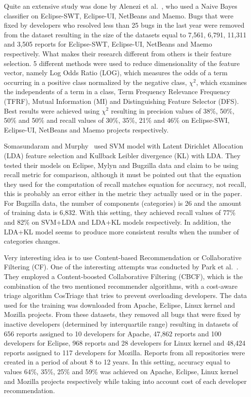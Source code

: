 Quite an extensive study was done by Alenezi et al.~\cite{Alenezi2013}, who used a Naive Bayes classifier on Eclipse-SWT, Eclipse-UI, NetBeans and Maemo. Bugs that were fixed by developers who resolved less than 25 bugs in the last year were removed from the dataset resulting in the size of the datasets equal to 7,561, 6,791, 11,311 and 3,505 reports for Eclipse-SWT, Eclipse-UI, NetBeans and Maemo respectively. What makes their research different from others is their feature selection. 5 different methods were used to reduce dimensionality of the feature vector, namely Log Odds Ratio (LOG), which measures the odds of a term occurring in a positive class normalized by the negative class, $\chi^2$, which examines the independents of a term in a class, Term Frequency Relevance Frequency (TFRF), Mutual Information (MI) and Distinguishing Feature Selector (DFS). Best results were achieved using $\chi^2$ resulting in precision values of 38\%, 50\%, 50\% and 50\% and recall values of 30\%, 35\%, 21\% and 46\% on Eclipse-SWI, Eclipse-UI, NetBeans and Maemo projects respectively.

Somasundaram and Murphy~\cite{Somasundaram2012} used SVM model with Latent Dirichlet Allocation (LDA) feature selection and Kullback Leibler divergence (KL) with LDA. They tested their models on Eclipse, Mylyn and Bugzilla data and claim to be using recall metric for comparison, although it must be pointed out that the equation they used for the computation of recall matches equation for accuracy, not recall, this is probably an error either in the metric they actually used or in the paper. For Bugzilla data, the number of components (categories) is 26 and the amount of training data is 6,832. With this setting, they achieved recall values of 77\% and 82\% on SVM+LDA and LDA+KL models respectively. In addition, the LDA+KL model seems to produce more consistent results when the number of categories changes.

Very interesting idea is to use Content-based Recommendation or Collaborative Filtering (CF). One of the interesting attempts was conducted by Park et al.~\cite{Park2011}. They employed a Content-boosted Collaborative Filtering (CBCF), which is the combination of the two mentioned recommender algorithms, with a cost-aware triage algorithm CosTriage that tries to prevent overloading developers. The data used for the training was downloaded from Apache, Eclipse, Linux kernel and Mozilla projects. From these datasets, they removed all bugs that were fixed by inactive developers (determined by interquartile range) resulting in datasets of 656 reports assigned to 10 developers for Apache, 47,862 reports and 100 developers for Eclipse, 968 reports and 28 developers for Linux kernel and 48,424 reports assigned to 117 developers for Mozilla. Reports from all repositories were created in a period of about 8 to 12 years. In this setting, accuracy equal to values 64\%, 35\%, 25\% and 59\% was achieved on Apache, Eclipse, Linux kernel and Mozilla projects respectively while taking into account cost of each developer recommendation.

